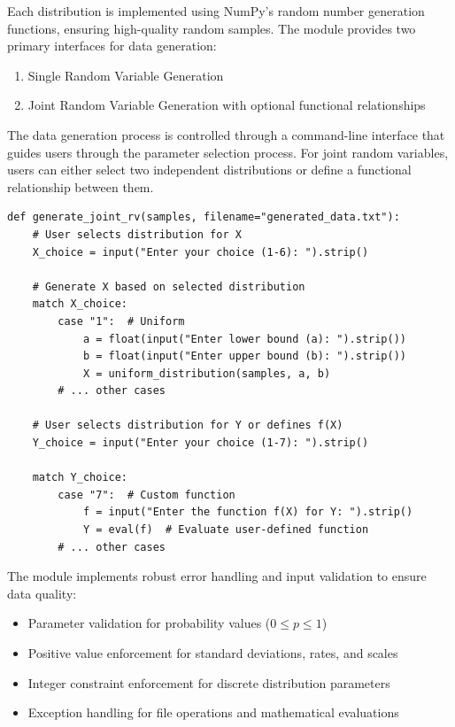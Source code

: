 \documentclass{article}
\begin{document}
Each distribution is implemented using NumPy's random number generation functions, ensuring high-quality random samples. The module provides two primary interfaces for data generation:

\begin{enumerate}
  \item Single Random Variable Generation
  \item Joint Random Variable Generation with optional functional relationships
\end{enumerate}

The data generation process is controlled through a command-line interface that guides users through the parameter selection process. For joint random variables, users can either select two independent distributions or define a functional relationship between them.

\begin{verbatim}
def generate_joint_rv(samples, filename="generated_data.txt"):
    # User selects distribution for X
    X_choice = input("Enter your choice (1-6): ").strip()
    
    # Generate X based on selected distribution
    match X_choice:
        case "1":  # Uniform
            a = float(input("Enter lower bound (a): ").strip())
            b = float(input("Enter upper bound (b): ").strip())
            X = uniform_distribution(samples, a, b)
        # ... other cases
        
    # User selects distribution for Y or defines f(X)
    Y_choice = input("Enter your choice (1-7): ").strip()
    
    match Y_choice:
        case "7":  # Custom function
            f = input("Enter the function f(X) for Y: ").strip()
            Y = eval(f)  # Evaluate user-defined function
        # ... other cases
\end{verbatim}

The module implements robust error handling and input validation to ensure data quality:

\begin{itemize}
  \item Parameter validation for probability values ($0 \le p \le 1$)
  \item Positive value enforcement for standard deviations, rates, and scales
  \item Integer constraint enforcement for discrete distribution parameters
  \item Exception handling for file operations and mathematical evaluations
\end{itemize}
\end{document}

